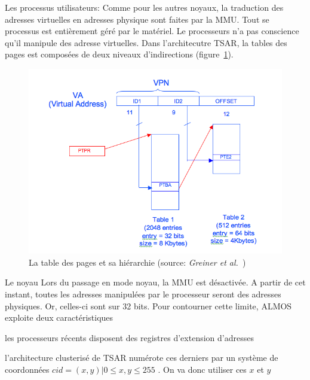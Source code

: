       \begin{paragraph}{Les processus utilisateurs:}
        Comme pour les autres noyaux, la traduction des adresses virtuelles en
        adresses physique sont faites par la MMU. Tout se processus est
        entièrement géré par le matériel. Le processeurs n'a pas conscience
        qu'il manipule des adresse virtuelles. Dans l'architecutre TSAR, la
        tables des pages est composées de deux niveaux d'indirections
        (figure~\ref{fig:page-table}).
        
        \begin{figure}
          \centering
          \includegraphics[scale=0.4]{include/img/pages_table_levels.png}
          \caption{La table des pages et sa hiérarchie (source: \textit{Greiner
              et al.}~\cite{tsar2008web})}
          \label{fig:page-table}
        \end{figure}
        
      \end{paragraph}
      \begin{paragraph}{Le noyau}
        Lors du passage en mode noyau, la MMU est désactivée. A partir de cet
        instant, toutes les adresses manipulées par le processeur seront des
        adresses physiques. Or, celles-ci sont sur 32 bits. Pour contourner
        cette limite, ALMOS exploite deux caractéristiques \benumline \item les
        processeurs récents disposent des registres d'extension d'adresses \item
        l'architecture clusterisé de TSAR numérote ces derniers par un système
        de coordonnées $cid = (x, y) | 0 \leq x,y \leq 255$ \eenumline. On va
        donc utiliser ces $x$ et $y$
      \end{paragraph}

